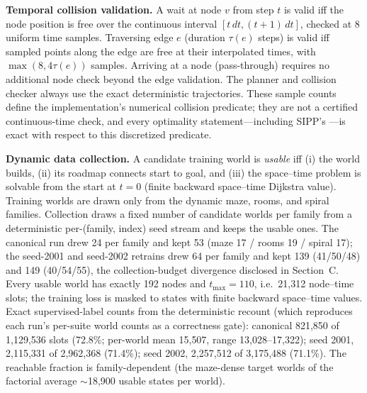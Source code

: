 \documentclass[letterpaper]{article} %
\begin{document}
\textbf{Temporal collision validation.} A wait at node $v$ from step $t$ is valid iff the node position is free over the continuous interval $[t\,dt, (t{+}1)\,dt]$, checked at 8 uniform time samples. Traversing edge $e$ (duration $\tau(e)$ steps) is valid iff sampled points along the edge are free at their interpolated times, with $\max(8, 4\tau(e))$ samples. Arriving at a node (pass-through) requires no additional node check beyond the edge validation. The planner and collision checker always use the exact deterministic trajectories. These sample counts define the implementation's numerical collision predicate; they are not a certified continuous-time check, and every optimality statement---including SIPP's \citep{phillips2011sipp}---is exact with respect to this discretized predicate.

\textbf{Dynamic data collection.} A candidate training world is \emph{usable} iff (i) the world builds, (ii) its roadmap connects start to goal, and (iii) the space--time problem is solvable from the start at $t{=}0$ (finite backward space--time Dijkstra value). Training worlds are drawn only from the dynamic maze, rooms, and spiral families. Collection draws a fixed number of candidate worlds per family from a deterministic per-(family, index) seed stream and keeps the usable ones. The canonical run drew 24 per family and kept 53 (maze 17 / rooms 19 / spiral 17); the seed-2001 and seed-2002 retrains drew 64 per family and kept 139 (41/50/48) and 149 (40/54/55), the collection-budget divergence disclosed in Section~C. Every usable world has exactly 192 nodes and $t_{\max}{=}110$, i.e.\ 21{,}312 node--time slots; the training loss is masked to states with finite backward space--time values. Exact supervised-label counts from the deterministic recount (which reproduces each run's per-suite world counts as a correctness gate): canonical 821{,}850 of 1{,}129{,}536 slots (72.8\%; per-world mean 15{,}507, range 13{,}028--17{,}322); seed 2001, 2{,}115{,}331 of 2{,}962{,}368 (71.4\%); seed 2002, 2{,}257{,}512 of 3{,}175{,}488 (71.1\%). The reachable fraction is family-dependent (the maze-dense target worlds of the factorial average $\sim$18{,}900 usable states per world).
\end{document}

